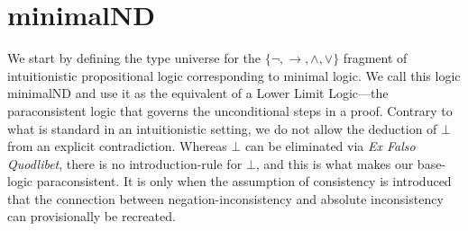 \documentclass[]{article}
\begin{document}






\section{{\sf minimalND}}\label{sec:lower}

We start by defining the type universe for the $\{\neg, \rightarrow, \wedge, \vee\}$ fragment of intuitionistic propositional logic corresponding to minimal logic. We call this logic {\sf minimalND} and use it as the equivalent of a Lower Limit Logic---the paraconsistent logic that governs the unconditional steps in a proof. Contrary to what is standard in an intuitionistic setting, we do not allow the deduction of $\bot$ from an explicit contradiction. Whereas $\bot$ can be eliminated via \emph{Ex Falso Quodlibet}, there is no introduction-rule for $\bot$, and this is what makes our base-logic paraconsistent. It is only when the assumption of consistency is introduced that the connection between negation-inconsistency and absolute inconsistency can provisionally be recreated.
\end{document}

